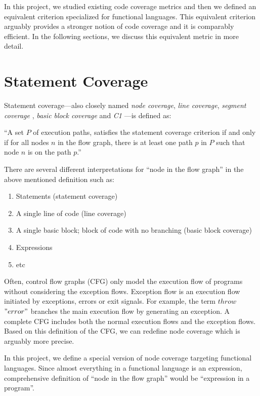 \documentclass[12pt,a4paper]{report}
\begin{document}
In this project, we studied existing code coverage metrics and then we defined an equivalent criterion specialized for functional languages. This equivalent criterion arguably provides a stronger notion of code coverage and it is comparably efficient. In the following sections, we discuss this equivalent metric in more detail.

\section{Statement Coverage}
Statement coverage---also closely named \emph{node coverage}, \emph{line coverage}, \emph{segment coverage} \cite{Ntafos:1988:CST:630792.631017}, \emph{basic block coverage} and \emph{C1} \cite{beizer2002software}---is defined as: 

``A set $P$ of execution paths, satisfies the statement coverage criterion if and only if for all nodes $n$ in the flow graph, there is at least one path $p$ in $P$ such that node $n$ is on the path $p$.''\cite{Zhu:1997:SUT:267580.267590}

There are several different interpretations for ``node in the flow graph'' in the above mentioned definition such as:

\begin{enumerate}
 \item Statements (statement coverage)
 \item A single line of code (line coverage)
 \item A single basic block; block of code with no branching (basic block coverage)
 \item Expressions 
 \item etc
\end{enumerate}

Often, control flow graphs (CFG) only model the execution flow of programs without considering the exception flows. Exception flow is an execution flow initiated by exceptions, errors or exit signals. For example, the term $throw$ $"error"$  branches the main execution flow by generating an exception. A complete CFG includes both the normal execution flows and the exception flows. Based on this definition of the CFG, we can redefine node coverage which is arguably more precise.

In this project, we define a special version of node coverage targeting functional languages. Since almost everything in a functional language is an expression, comprehensive definition of ``node in the flow graph'' would be ``expression in a program''. 
\end{document}
